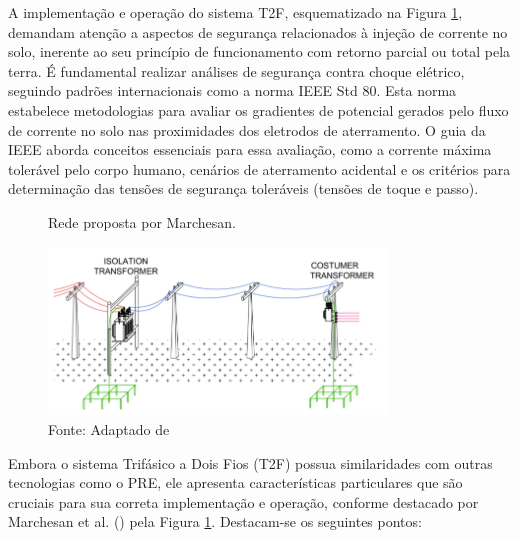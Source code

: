 \documentclass[oneside,openright,12pt]{ufsm_2021} %
\begin{document}
\par A implementação e operação do sistema T2F, esquematizado na Figura \ref{fig:RedeT2FAdptadoMarchesan2023}, demandam atenção a aspectos de segurança relacionados à injeção de corrente no solo, inerente ao seu princípio de funcionamento com retorno parcial ou total pela terra. É fundamental realizar análises de segurança contra choque elétrico, seguindo padrões internacionais como a norma IEEE Std 80. Esta norma estabelece metodologias para avaliar os gradientes de potencial gerados pelo fluxo de corrente no solo nas proximidades dos eletrodos de aterramento. O guia da IEEE aborda conceitos essenciais para essa avaliação, como a corrente máxima tolerável pelo corpo humano, cenários de aterramento acidental e os critérios para determinação das tensões de segurança toleráveis (tensões de toque e passo).

\begin{figure}[H]
	\centering
	\caption{Rede proposta por Marchesan.}
	\includegraphics[width=0.8\textwidth]{figuras/Imagem3T2F2023.png}
	\caption*{Fonte: Adaptado de \cite{marchesan_three-phase-two-wire_2023}}
	\label{fig:RedeT2FAdptadoMarchesan2023}
\end{figure}

\par Embora o sistema Trifásico a Dois Fios (T2F) possua similaridades com outras tecnologias como o PRE, ele apresenta características particulares que são cruciais para sua correta implementação e operação, conforme destacado por Marchesan et al. (\citeyear{marchesan_three-phase-two-wire_2023}) pela Figura \ref{fig:RedeT2FAdptadoMarchesan2023}. Destacam-se os seguintes pontos:
\end{document}
